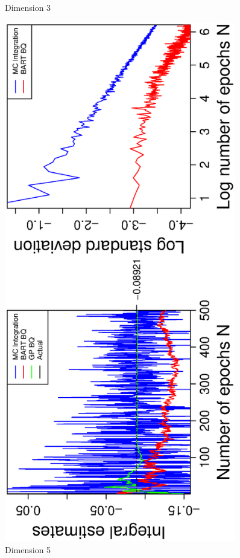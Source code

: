 \begin{figure}[H]
\begin{minipage}[b]{0.4\textwidth}
     \vspace{-1cm}
     \caption{Dimension 3}
  \end{minipage}
    \hspace{1.5cm}
  \begin{minipage}[b]{0.4\textwidth}
    \includegraphics[width= 0.9\textwidth, angle = -90]{report/Figures/5/convergenceMean55Dimensions.eps}
    \vspace{-1cm}
    \caption{Dimension 5}
  \end{minipage}
\end{figure}
\vspace{-1cm}

